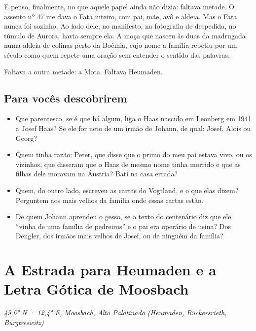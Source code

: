 \documentclass[
  brazilian,
  11pt,
  openany]{book}
\providecommand{\tightlist}{%
  \setlength{\itemsep}{0pt}\setlength{\parskip}{0pt}}
\begin{document}
E penso, finalmente, no que aquele papel ainda não dizia: faltava
metade. O assento nº 47 me dava o Fata inteiro, com pai, mãe, avô e
aldeia. Mas o Fata nunca foi sozinho. Ao lado dele, no manifesto, na
fotografia de despedida, no túmulo de Aurora, havia sempre ela. A moça
que nasceu às duas da madrugada numa aldeia de colinas perto da Boêmia,
cujo nome a família repetiu por um século como quem repete uma oração
sem entender o sentido das palavras.

Faltava a outra metade: a Mota. Faltava Heumaden.

\section{Para vocês descobrirem}\label{para-vocuxeas-descobrirem-16}

\begin{itemize}
\tightlist
\item
  Que parentesco, se é que há algum, liga o Haas nascido em Leonberg em
  1941 a Josef Haas? Se ele for neto de um irmão de Johann, de qual:
  Josef, Alois ou Georg?
\item
  Quem tinha razão: Peter, que disse que o primo do meu pai estava vivo,
  ou os vizinhos, que disseram que o Haas de mesmo nome tinha morrido e
  que as filhas dele moravam na Áustria? Bati na casa errada?
\item
  Quem, do outro lado, escreveu as cartas do Vogtland, e o que elas
  dizem? Perguntem aos mais velhos da família onde essas cartas estão.
\item
  De quem Johann aprendeu o gesso, se o texto do centenário diz que ele
  ``vinha de uma família de pedreiros'' e o pai era operário de usina?
  Dos Dengler, dos irmãos mais velhos de Josef, ou de ninguém da
  família?
\end{itemize}

\chapter{A Estrada para Heumaden e a Letra Gótica de
Moosbach}\label{cap-18}

\emph{49,6° N · 12,4° E, Moosbach, Alto Palatinado (Heumaden,
Rückersrieth, Burgtreswitz)}
\end{document}
